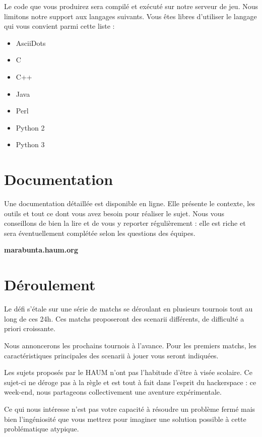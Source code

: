 \documentclass[a4paper, 11pt]{article}
\begin{document}
Le code que vous produirez sera compilé et exécuté sur notre serveur de jeu.
Nous limitons notre support aux langages suivants. Vous êtes libres d’utiliser
le langage qui vous convient parmi cette liste :

\begin{itemize}
	\item AsciiDots
	\item C
	\item C++
	\item Java
	\item Perl
	\item Python 2
	\item Python 3
\end{itemize}

	\section{Documentation}

\textcolor{Sblue}{Une documentation détaillée est disponible en ligne. Elle
présente le contexte, les outils et tout ce dont vous avez besoin pour réaliser
le sujet. Nous vous conseillons de bien la lire et de vous y reporter
régulièrement : elle est riche et sera éventuellement complétée selon les
questions des équipes.}

\begin{center}
	\color{Sblue}\Large\bfseries
	marabunta.haum.org
\end{center}

\hfill

	\section{Déroulement}

Le défi s’étale sur une série de matchs se déroulant en plusieurs tournois tout
au long de ces 24h. Ces matchs proposeront des scenarii différents, de
difficulté a priori croissante.

Nous annoncerons les prochains tournois à l’avance. Pour les premiers matchs,
les caractéristiques principales des scenarii à jouer vous seront indiquées.

Les sujets proposés par le HAUM n’ont pas l’habitude d’être à visée scolaire. Ce
sujet-ci ne déroge pas à la règle et est tout à fait dans l’esprit du
hackerspace : ce week-end, nous partageons collectivement une aventure
expérimentale.

Ce qui nous intéresse n’est pas votre capacité à résoudre un problème fermé mais
bien l’ingéniosité que vous mettrez pour imaginer une solution possible à cette
problématique atypique.
\end{document}

